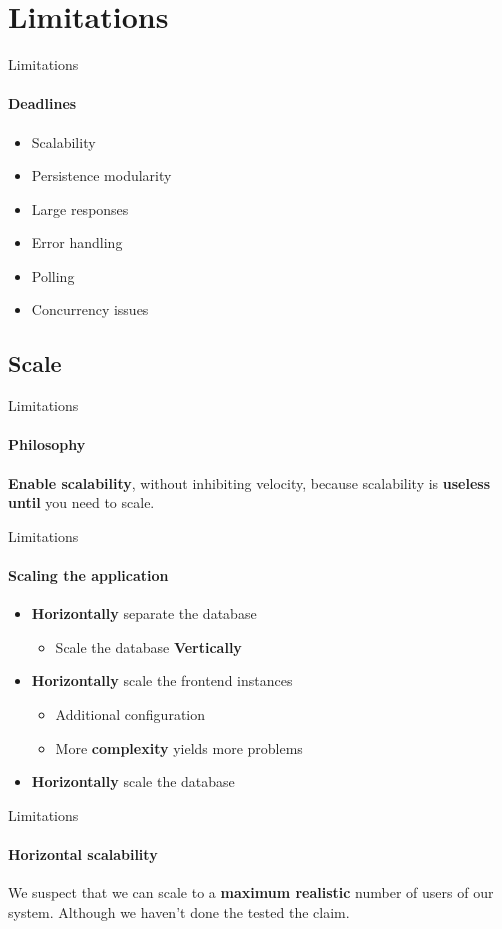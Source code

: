 \section{Limitations}
\author{Jesper}
\begin{frame}{Limitations}
	\framesubtitle{Deadlines}
	\begin{itemize}
		\item{Scalability}
		\item{Persistence modularity}
		\item{Large responses}
		\item{Error handling}
		\item{Polling}
		\item{Concurrency issues}
	\end{itemize}
\end{frame}

\subsection{Scale}

\begin{frame}{Limitations}
	\framesubtitle{Philosophy}
	\textbf{Enable scalability}, without inhibiting velocity,
	because scalability is \textbf{useless until} you need to scale.
\end{frame}

\begin{frame}{Limitations}
	\framesubtitle{Scaling the application}
	\begin{itemize}
		\item\textbf{Horizontally} separate the database
			\begin{itemize}
				\item Scale the database \textbf{Vertically}
			\end{itemize}
		\item \textbf{Horizontally} scale the frontend instances
			\begin{itemize}
				\item Additional configuration
				\item More \textbf{complexity} yields more problems
			\end{itemize}
		\item \textbf{Horizontally} scale the database
	\end{itemize}
\end{frame}

\begin{frame}{Limitations}
	\framesubtitle{Horizontal scalability}
	We suspect that we can scale to a \textbf{maximum realistic} number of users of our system. Although we haven't done the tested the claim.
\end{frame}

